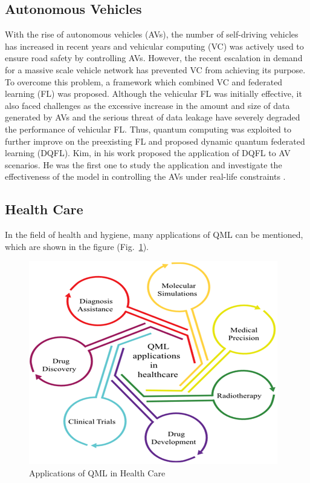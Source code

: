 \documentclass[conference]{IEEEtran}
\begin{document}
\subsection{Autonomous Vehicles}
With the rise of autonomous vehicles (AVs), the number of self-driving vehicles has increased in recent years and vehicular computing (VC) was actively used to ensure road safety by controlling AVs. However, the recent escalation in demand for a massive scale vehicle network has prevented VC from achieving its purpose. To overcome this problem, a framework which combined VC and federated learning (FL) was proposed. Although the vehicular FL was initially effective, it also faced challenges as the excessive increase in the amount and size of data generated by AVs and the serious threat of data leakage have severely degraded the performance of vehicular FL. Thus, quantum computing was exploited to further improve on the preexisting FL and proposed dynamic quantum federated learning (DQFL). Kim, in his work proposed the application of DQFL to AV scenarios. He was the first one to study the application and investigate the effectiveness of the model in controlling the AVs under real-life constraints \cite{b38}.

\subsection{Health Care}
In the field of health and hygiene, many applications of QML can be mentioned, which are shown in the figure (Fig.~\ref{fig10}).

\begin{figure}[htbp]
	\centerline{\includegraphics[scale = 0.9]{health.png}}
	\caption{Applications of QML in Health Care \cite{b29}}
	\label{fig10}
\end{figure}
\end{document}
